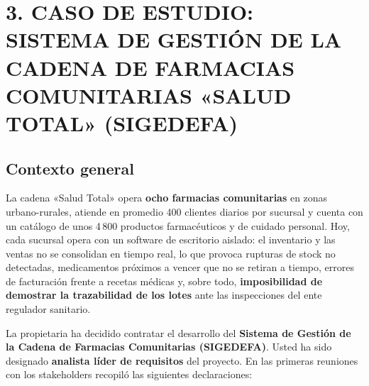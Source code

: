 \documentclass[11pt]{article}
\begin{document}
\newpage
\section*{\textcolor{utegreendk}{3. CASO DE ESTUDIO: SISTEMA DE GESTIÓN DE LA CADENA DE FARMACIAS COMUNITARIAS «SALUD TOTAL» (SIGEDEFA)}}

\subsection*{Contexto general}

La cadena «Salud Total» opera \textbf{ocho farmacias comunitarias} en zonas urbano-rurales, atiende en promedio 400 clientes diarios por sucursal y cuenta con un catálogo de unos 4\,800 productos farmacéuticos y de cuidado personal. Hoy, cada sucursal opera con un software de escritorio aislado: el inventario y las ventas no se consolidan en tiempo real, lo que provoca rupturas de stock no detectadas, medicamentos próximos a vencer que no se retiran a tiempo, errores de facturación frente a recetas médicas y, sobre todo, \textbf{imposibilidad de demostrar la trazabilidad de los lotes} ante las inspecciones del ente regulador sanitario.

La propietaria ha decidido contratar el desarrollo del \textbf{Sistema de Gestión de la Cadena de Farmacias Comunitarias (SIGEDEFA)}. Usted ha sido designado \textbf{analista líder de requisitos} del proyecto. En las primeras reuniones con los stakeholders recopiló las siguientes declaraciones:
\end{document}

